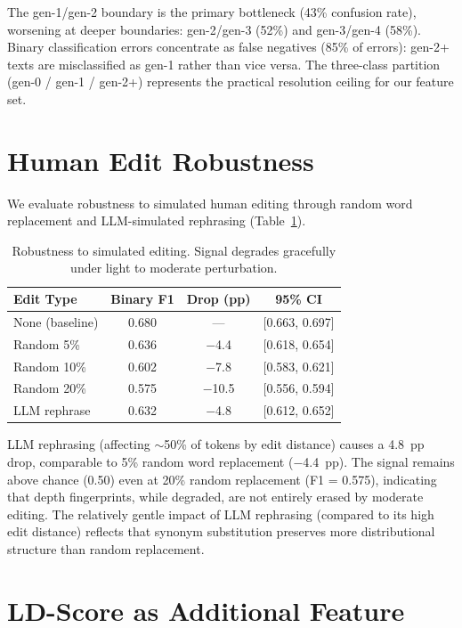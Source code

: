 \documentclass[11pt,a4paper]{article}
\begin{document}
The gen-1/gen-2 boundary is the primary bottleneck (43\% confusion rate), worsening at deeper boundaries: gen-2/gen-3 (52\%) and gen-3/gen-4 (58\%).
Binary classification errors concentrate as false negatives (85\% of errors): gen-2+ texts are misclassified as gen-1 rather than vice versa.
The three-class partition (gen-0 / gen-1 / gen-2+) represents the practical resolution ceiling for our feature set.

\section{Human Edit Robustness}
\label{app:human_edit}

We evaluate robustness to simulated human editing through random word replacement and LLM-simulated rephrasing (Table~\ref{tab:edit}).

\begin{table}[h]
\centering
\small
\caption{Robustness to simulated editing. Signal degrades gracefully under light to moderate perturbation.}
\label{tab:edit}
\begin{tabular}{lccc}
\toprule
\textbf{Edit Type} & \textbf{Binary F1} & \textbf{Drop (pp)} & \textbf{95\% CI} \\
\midrule
None (baseline) & 0.680 & --- & {[0.663, 0.697]} \\
Random 5\% & 0.636 & $-$4.4 & {[0.618, 0.654]} \\
Random 10\% & 0.602 & $-$7.8 & {[0.583, 0.621]} \\
Random 20\% & 0.575 & $-$10.5 & {[0.556, 0.594]} \\
LLM rephrase & 0.632 & $-$4.8 & {[0.612, 0.652]} \\
\bottomrule
\end{tabular}
\end{table}

LLM rephrasing (affecting $\sim$50\% of tokens by edit distance) causes a 4.8~pp drop, comparable to 5\% random word replacement ($-$4.4~pp).
The signal remains above chance (0.50) even at 20\% random replacement (F1 = 0.575), indicating that depth fingerprints, while degraded, are not entirely erased by moderate editing.
The relatively gentle impact of LLM rephrasing (compared to its high edit distance) reflects that synonym substitution preserves more distributional structure than random replacement.

\section{LD-Score as Additional Feature}
\label{app:ld_score}
\end{document}
